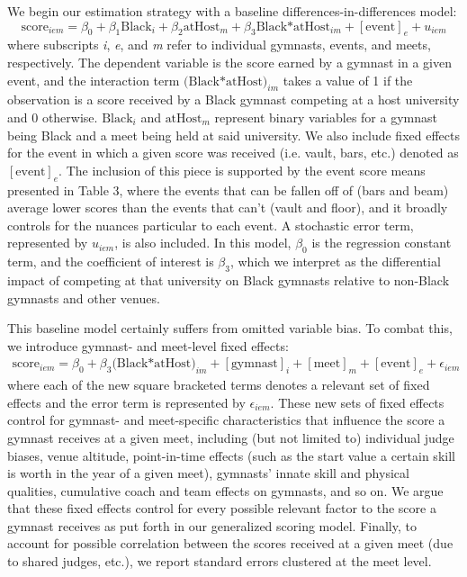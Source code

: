 \documentclass[12pt]{article}
\begin{document}
We begin our estimation strategy with a baseline differences-in-differences model:
\begin{equation}
    \text{score}_{iem} = \beta_0 + \beta_1 \text{Black}_i + \beta_2 \text{atHost}_m + \beta_3 \text{Black*atHost}_{im} + [\text{event}]_e + u_{iem}
\end{equation}
\noindent where subscripts \textit{i}, \textit{e}, and \textit{m} refer to individual gymnasts, events, and meets, respectively. The dependent variable is the score earned by a gymnast in a given event, and the interaction term $\text{(Black*atHost)}_{im}$ takes a value of 1 if the observation is a score received by a Black gymnast competing at a host university and 0 otherwise. $\text{Black}_i$ and $\text{atHost}_m$ represent binary variables for a gymnast being Black and a meet being held at said university. We also include fixed effects for the event in which a given score was received  (i.e. vault, bars, etc.) denoted as $[\text{event}]_e$. The inclusion of this piece is supported by the event score means presented in Table 3, where the events that can be fallen off of (bars and beam) average lower scores than the events that can't (vault and floor), and it broadly controls for the nuances particular to each event. A stochastic error term, represented by $u_{iem}$, is also included. In this model, $\beta_0$ is the regression constant term, and the coefficient of interest is $\beta_3$, which we interpret as the differential impact of competing at that university on Black gymnasts relative to non-Black gymnasts and other venues.

This baseline model certainly suffers from omitted variable bias. To combat this, we introduce gymnast- and meet-level fixed effects:
\begin{gather}
    \text{score}_{iem}  =  \beta_0 + \beta_3 \text{(Black*atHost)}_{im} + [\text{gymnast}]_i + [\text{meet}]_m + [\text{event}]_e + \epsilon_{iem}
\end{gather}
\noindent where each of the new square bracketed terms denotes a relevant set of fixed effects and the error term is represented by $\epsilon_{iem}$. These new sets of fixed effects control for gymnast- and meet-specific characteristics that influence the score a gymnast receives at a given meet, including (but not limited to) individual judge biases, venue altitude, point-in-time effects (such as the start value a certain skill is worth in the year of a given meet), gymnasts’ innate skill and physical qualities, cumulative coach and team effects on gymnasts, and so on. We argue that these fixed effects control for every possible relevant factor to the score a gymnast receives as put forth in our generalized scoring model. Finally, to account for possible correlation between the scores received at a given meet (due to shared judges, etc.), we report standard errors clustered at the meet level.
\end{document}
